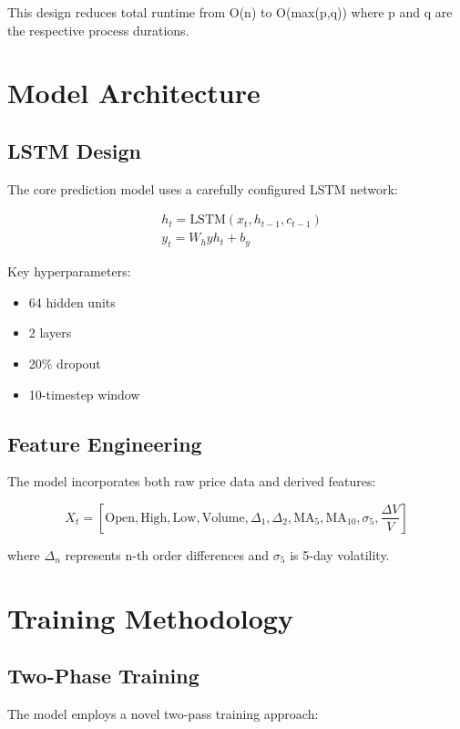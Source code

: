 \documentclass{article}
\begin{document}
	This design reduces total runtime from O(n) to O(max(p,q)) where p and q are the respective process durations.
	
	\section{Model Architecture}
	
	\subsection{LSTM Design}
	The core prediction model uses a carefully configured LSTM network:
	
	\begin{equation}
		\begin{aligned}
			&h_t = \text{LSTM}(x_t, h_{t-1}, c_{t-1}) \\
			&y_t = W_hy h_t + b_y
		\end{aligned}
	\end{equation}
	
	Key hyperparameters:
	\begin{itemize}
		\item 64 hidden units
		\item 2 layers
		\item 20\% dropout
		\item 10-timestep window
	\end{itemize}
	
	\subsection{Feature Engineering}
	The model incorporates both raw price data and derived features:
	
	\begin{equation}
		X_t = [\text{Open}, \text{High}, \text{Low}, \text{Volume}, \Delta_1, \Delta_2, \text{MA}_5, \text{MA}_{10}, \sigma_5, \frac{\Delta V}{V}]
	\end{equation}
	
	where $\Delta_n$ represents n-th order differences and $\sigma_5$ is 5-day volatility.
	
	\section{Training Methodology}
	
	\subsection{Two-Phase Training}
	The model employs a novel two-pass training approach:
	
\end{document}
